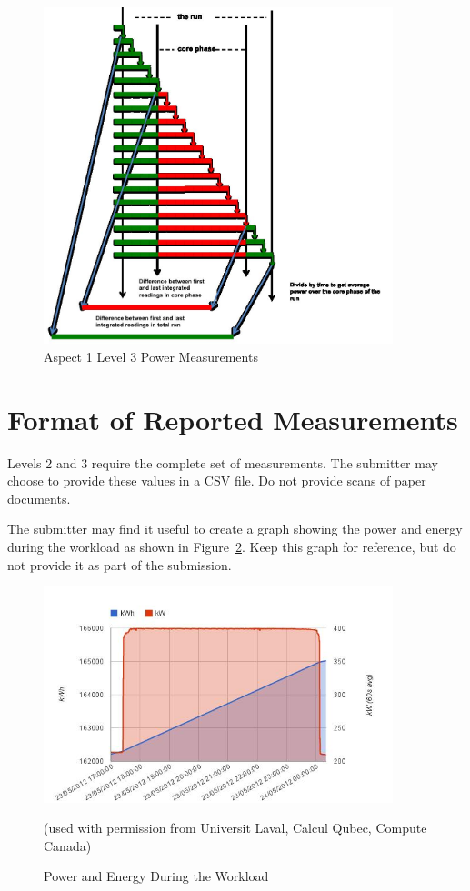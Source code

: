 \begin{figure}
\centering
\includegraphics[width=4in]{fig3-5}
\caption{Aspect 1 Level 3 Power Measurements}
\label{fig:a1l3pm}
\end{figure}

\section{Format of Reported Measurements}
\label{sec:FoRM}
\noindent
Levels 2 and 3 require the complete set of measurements. The submitter may choose to provide these values in a CSV file. Do not provide scans of paper documents.
\wl

\noindent
The submitter may find it useful to create a graph showing the power and energy during the workload as shown in Figure~\ref{fig:powengwl}. Keep this graph for reference, but do not provide it as part of the submission.


\begin{figure}
\centering
\includegraphics[width=4in]{fig3-6}
\caption{Power and Energy During the Workload}
(used with permission from Universit Laval, Calcul Qubec, Compute Canada)
\label{fig:powengwl}
\end{figure}


